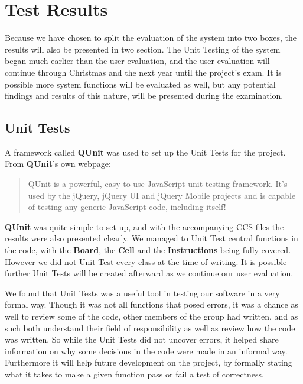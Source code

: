 \section{Test Results}
\label{sec:testresults}

Because we have chosen to split the evaluation of the system into two boxes, the results will also be presented in two section. The Unit Testing of the system began much earlier than the user evaluation, and the user evaluation will continue through Christmas and the next year until the project's exam. It is possible more system functions will be evaluated as well, but any potential findings and results of this nature, will be presented during the examination.

\subsection{Unit Tests}

A framework called \textbf{QUnit} was used to set up the Unit Tests for the project.
From \textbf{QUnit}'s own webpage:

\begin{quotation}
QUnit is a powerful, easy-to-use JavaScript unit testing framework. It's used by the jQuery, jQuery UI and jQuery Mobile projects and is capable of testing any generic JavaScript code, including itself!\cite{qunit}
\end{quotation}

\textbf{QUnit} was quite simple to set up, and with the accompanying CCS files the results were also presented clearly. We managed to Unit Test central functions in the code, with the \textbf{Board}, the \textbf{Cell} and the \textbf{Instructions} being fully covered.  However we did not Unit Test every class at the time of writing. It is possible further Unit Tests will be created afterward as we continue our user evaluation.


We found that Unit Tests was a useful tool in testing our software in a very formal way. Though it was not all functions that posed errors, it was a chance as well to review some of the code, other members of the group had written, and as such both understand their field of responsibility as well as review how the code was written. So while the Unit Tests did not uncover errors, it helped share information on why some decisions in the code were made in an informal way. Furthermore it will help future development on the project, by formally stating what it takes to make a given function pass or fail a test of correctness.


